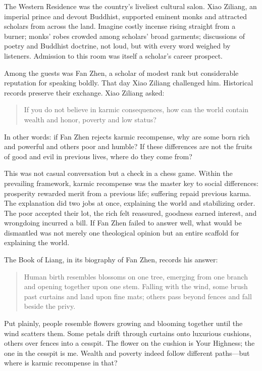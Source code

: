 The Western Residence was the country's liveliest cultural salon. Xiao Ziliang, an imperial prince and devout Buddhist, supported eminent monks and attracted scholars from across the land. Imagine costly incense rising straight from a burner; monks' robes crowded among scholars' broad garments; discussions of poetry and Buddhist doctrine, not loud, but with every word weighed by listeners. Admission to this room was itself a scholar's career prospect.

Among the guests was Fan Zhen, a scholar of modest rank but considerable reputation for speaking boldly. That day Xiao Ziliang challenged him. Historical records preserve their exchange. Xiao Ziliang asked:

\begin{quote}
If you do not believe in karmic consequences, how can the world contain wealth and honor, poverty and low status?
\end{quote}
In other words: if Fan Zhen rejects karmic recompense, why are some born rich and powerful and others poor and humble? If these differences are not the fruits of good and evil in previous lives, where do they come from?

This was not casual conversation but a check in a chess game. Within the prevailing framework, karmic recompense was the master key to social differences: prosperity rewarded merit from a previous life; suffering repaid previous karma. The explanation did two jobs at once, explaining the world and stabilizing order. The poor accepted their lot, the rich felt reassured, goodness earned interest, and wrongdoing incurred a bill. If Fan Zhen failed to answer well, what would be dismantled was not merely one theological opinion but an entire scaffold for explaining the world.

The Book of Liang, in its biography of Fan Zhen, records his answer:

\begin{quote}
Human birth resembles blossoms on one tree, emerging from one branch and opening together upon one stem. Falling with the wind, some brush past curtains and land upon fine mats; others pass beyond fences and fall beside the privy.
\end{quote}
Put plainly, people resemble flowers growing and blooming together until the wind scatters them. Some petals drift through curtains onto luxurious cushions, others over fences into a cesspit. The flower on the cushion is Your Highness; the one in the cesspit is me. Wealth and poverty indeed follow different paths---but where is karmic recompense in that?

